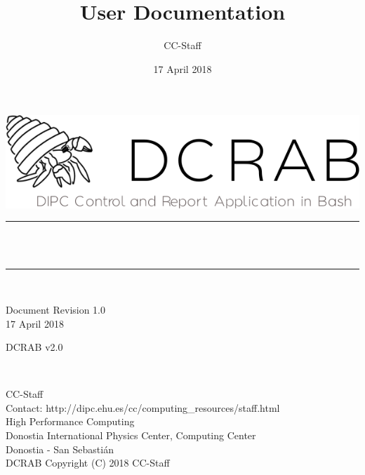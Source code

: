 \documentclass[10pt,a4paper]{report}
\author{CC-Staff}
\title{User Documentation}
\date{17 April 2018}
\makeatletter
\let\thetitle\@title
\makeatother
\begin{document}

\begin{titlepage}
	\centering
    \vspace*{3 cm}
    \includegraphics[scale = 0.6]{../aux/logos/DCRAB_logo.png}\\[1.0 cm]
		\vspace*{2 cm}
	\rule{\linewidth}{0.2 mm} \\[0.4 cm]
	{ \huge \bfseries \thetitle}\\
	\rule{\linewidth}{0.2 mm} \\[0.4 cm]
\vspace*{4.5 cm}
	\begin{minipage}{0.4\textwidth}
		\begin{flushleft} \large
			Document Revision 1.0\\
			17 April 2018\\
			\end{flushleft}
			\end{minipage}
			\begin{minipage}{0.4 \textwidth}
			\begin{flushright} \large
			DCRAB v2.0\\
		\end{flushright}
	\end{minipage}\\[2 cm]

\newpage
\thispagestyle{empty}
\begin{flushleft}
CC-Staff \\
Contact: http://dipc.ehu.es/cc/computing\_resources/staff.html \\
High Performance Computing \\
Donostia International Physics Center, Computing Center \\
Donostia - San Sebastián \\
\vspace{1cm}
DCRAB Copyright (C) 2018 CC-Staff
\end{flushleft}

\newpage
\end{titlepage}
\end{document}
